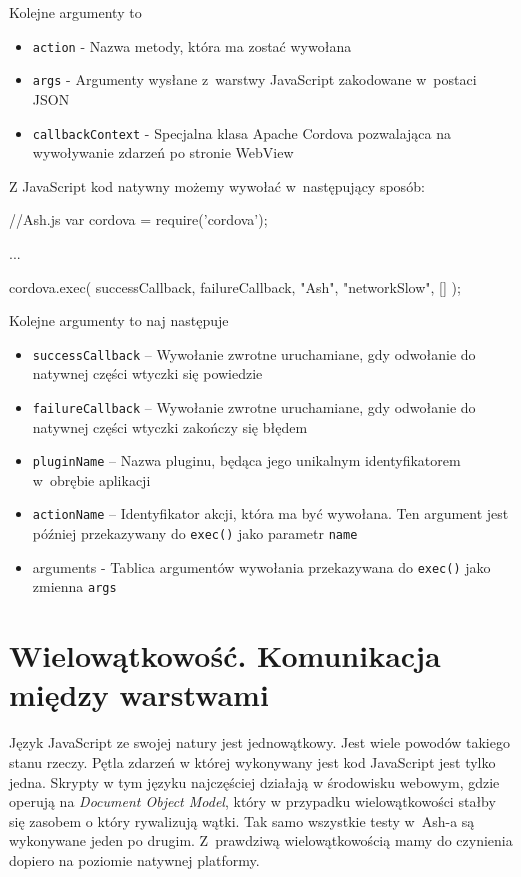 \documentclass[brudnopis]{xmgr}
\begin{document}
Kolejne argumenty to
\begin{itemize}
  \item \texttt{action} - Nazwa metody, która ma zostać wywołana
  \item \texttt{args} - Argumenty wysłane z~warstwy JavaScript zakodowane w~postaci JSON
  \item \texttt{callbackContext} - Specjalna klasa Apache Cordova pozwalająca na wywoływanie zdarzeń po stronie WebView 
\end{itemize}

Z JavaScript kod natywny możemy wywołać w~następujący sposób:

\begin{javascriptcode}
//Ash.js
var cordova = require('cordova');

...

cordova.exec( 
        successCallback,
        failureCallback, 
        "Ash", 
        "networkSlow", 
        []
);
\end{javascriptcode}

Kolejne argumenty to naj następuje
\begin{itemize}
  \item \texttt{successCallback} -- Wywołanie zwrotne uruchamiane, gdy odwołanie do natywnej części wtyczki się powiedzie
  \item \texttt{failureCallback} -- Wywołanie zwrotne uruchamiane, gdy odwołanie do natywnej części wtyczki zakończy się błędem
  \item \texttt{pluginName} -- Nazwa pluginu, będąca jego unikalnym identyfikatorem w~obrębie aplikacji
  \item \texttt{actionName} -- Identyfikator akcji, która ma być wywołana. Ten argument jest później przekazywany do \texttt{exec()} jako parametr \texttt{name} 
\item arguments - Tablica argumentów wywołania przekazywana do \texttt{exec()} jako zmienna \texttt{args} 
\end{itemize}

\section{Wielowątkowość. Komunikacja między warstwami}

Język JavaScript ze swojej natury jest jednowątkowy. Jest wiele powodów takiego stanu rzeczy. Pętla zdarzeń w której wykonywany jest kod JavaScript jest tylko jedna. Skrypty w tym języku najczęściej działają w środowisku webowym, gdzie operują na \textit{Document Object Model}, który w przypadku wielowątkowości stałby się zasobem o który rywalizują wątki. Tak samo wszystkie testy w~Ash-a są wykonywane jeden po drugim.  Z~prawdziwą wielowątkowością mamy do czynienia dopiero na poziomie natywnej platformy.
\end{document}
